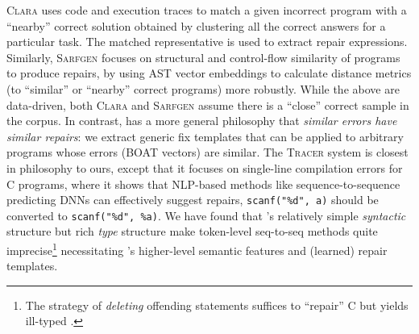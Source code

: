 %
\textsc{Clara} \citep{Gulwani_2018} uses code and execution traces 
to match a given incorrect program with a ``nearby'' correct solution 
obtained by clustering all the correct answers for a particular task.
The matched representative is used to extract repair expressions. 
%
Similarly, \textsc{Sarfgen} \citep{Wang_2018} focuses on structural 
and control-flow similarity of programs to produce repairs, by using 
AST vector embeddings to calculate distance metrics (to ``similar'' 
or ``nearby'' correct programs) more robustly.
%
While the above are data-driven, both \textsc{Clara} and \textsc{Sarfgen} 
assume there is a ``close'' correct sample in the corpus. 
%
In contrast, \toolname has a more general philosophy that 
\emph{similar errors have similar repairs}: we extract 
generic fix templates that can be applied to arbitrary 
programs whose errors (BOAT vectors) are similar.
%
The \textsc{Tracer} system \cite{TRACER2018} is closest 
in philosophy to ours, except that it focuses on single-line 
compilation errors for C programs, where it shows that 
NLP-based methods like sequence-to-sequence predicting 
DNNs can effectively suggest repairs, \eg \verb+scanf("%d", a)+ 
should be converted to \verb+scanf("%d", %a)+. 
%
We have found that \ocaml's relatively simple 
\emph{syntactic} structure but rich \emph{type} 
structure make token-level seq-to-seq methods 
quite imprecise\footnote{The strategy of 
\emph{deleting} offending statements 
suffices to ``repair'' C but yields ill-typed 
\ocaml.} necessitating \toolname's higher-level 
semantic features and (learned) repair templates.


%
% 


